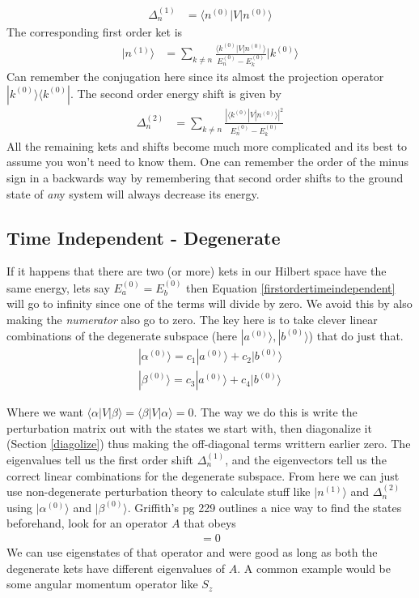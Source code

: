 \begin{align}
\Delta_n^{(1)} &= \langle n^{(0)}|V|n^{(0)}\rangle
\end{align}
The corresponding first order ket is
\begin{align}\label{firstordertimeindependent}
 |n^{(1)}\rangle &= \sum_{k\neq n}\frac{\langle k^{(0)} |V|n^{(0)}\rangle}{E_n^{(0)}-E_k^{(0)}}|k^{(0)}\rangle
\end{align}
Can remember the conjugation here since its almost the projection operator $|k^{(0)}\rangle\langle k^{(0)}|$. The second order energy shift is given by
\begin{align}
\Delta_n^{(2)} &= \sum_{k\neq n} \frac{|\langle k^{(0)}| V| n^{(0)}\rangle|^2}{E_n^{(0)} - E_k^{(0)}}
\end{align}
All the remaining kets and shifts become much more complicated and its best to assume you won't need to know them. One can remember the order of the minus sign in a backwards way by remembering that second order shifts to the ground state of \emph{an}y system will always decrease its energy. 


\subsection{Time Independent - Degenerate}
If it happens that there are two (or more) kets in our Hilbert space have the same energy, lets say $E_a^{(0)} = E_b^{(0)}$ then Equation \ref{firstordertimeindependent} will go to infinity since one of the terms will divide by zero. We avoid this by also making the \emph{numerator} also go to zero. The key here is to take clever linear combinations of the degenerate subspace (here $|a^{(0)}\rangle, |b^{(0)}\rangle$) that do just that. 
\begin{align}
|\alpha^{(0)}\rangle = c_1 |a^{(0)}\rangle + c_2|b^{(0)}\rangle\\
|\beta^{(0)}\rangle = c_3|a^{(0)}\rangle + c_4|b^{(0)}\rangle
\end{align}

Where we want $\langle \alpha |V |\beta \rangle = \langle \beta |V|\alpha\rangle  = 0$. The way we do this is write the perturbation matrix out with the states we start with, then diagonalize it (Section \ref{diagolize}) thus making the off-diagonal terms writtern earlier zero. The eigenvalues tell us the first order shift $\Delta_n^{(1)}$, and the eigenvectors tell us the correct linear combinations for the degenerate subspace. From here we can just use non-degenerate perturbation theory to calculate stuff like $|n^{(1)}\rangle$ and $\Delta_n^{(2)}$ using $|\alpha^{(0)}\rangle$ and $|\beta^{(0)}\rangle$. 
Griffith's pg 229 outlines a nice way to find the states beforehand, look for an operator $A$ that obeys 
\begin{align}
[A,V] = 0
\end{align}
We can use eigenstates of that operator and were good as long as both the degenerate kets have different eigenvalues of $A$. A common example would be some angular momentum operator like $S_z$

